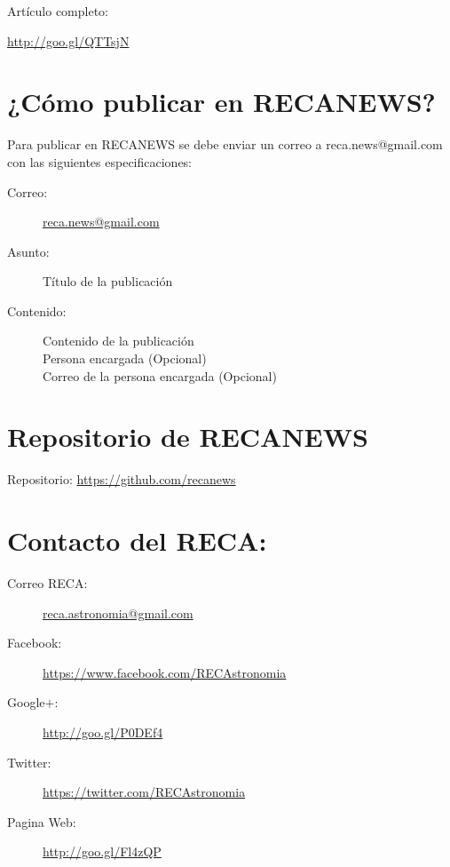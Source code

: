 \documentclass{book}
\begin{document}
Artículo completo:
\begin{center}
\url{http://goo.gl/QTTsjN}
\end{center}



\section*{¿Cómo publicar en RECANEWS?}

Para publicar en RECANEWS se debe enviar un correo a reca.news@gmail.com con las siguientes especificaciones:
\begin{description}
\item[Correo:]\url{reca.news@gmail.com}
\item[Asunto:]Título de la publicación
\item[Contenido:]Contenido de la publicación\\
Persona encargada (Opcional)\\
Correo de la persona encargada (Opcional)
\end{description}
  
\section*{Repositorio de RECANEWS}

Repositorio: \url{https://github.com/recanews}\\



\section*{Contacto del RECA:}

\begin{description}
\item[Correo RECA:]\url{reca.astronomia@gmail.com}
\item[Facebook:] \url{https://www.facebook.com/RECAstronomia}
\item[Google$+$:] \url{http://goo.gl/P0DEf4}
\item[Twitter:] \url{https://twitter.com/RECAstronomia}
\item[Pagina Web:] \url{http://goo.gl/Fl4zQP}
\end{description}
\end{document}
